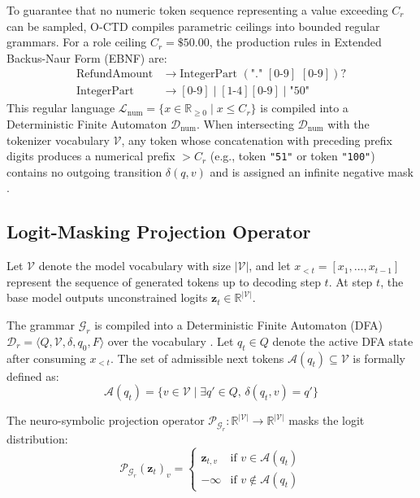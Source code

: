 \documentclass[preprint,12pt,3p]{elsarticle}
\begin{document}
To guarantee that no numeric token sequence representing a value exceeding $C_r$ can be sampled, O-CTD compiles parametric ceilings into bounded regular grammars. For a role ceiling $C_r = \$50.00$, the production rules in Extended Backus-Naur Form (EBNF) are:
\begin{align}
    \text{RefundAmount} &\to \text{IntegerPart} \,\, (\text{"."} \,\, [0\text{-}9] \,\, [0\text{-}9])? \\
    \text{IntegerPart} &\to [0\text{-}9] \mid [1\text{-}4][0\text{-}9] \mid \text{"50"}
\end{align}
This regular language $\mathcal{L}_{\text{num}} = \{ x \in \mathbb{R}_{\ge 0} \mid x \le C_r \}$ is compiled into a Deterministic Finite Automaton $\mathcal{D}_{\text{num}}$. When intersecting $\mathcal{D}_{\text{num}}$ with the tokenizer vocabulary $\mathcal{V}$, any token whose concatenation with preceding prefix digits produces a numerical prefix $> C_r$ (e.g., token \texttt{"51"} or token \texttt{"100"}) contains no outgoing transition $\delta(q, v)$ and is assigned an infinite negative mask \cite{beurer2024guiding}.

\subsection{Logit-Masking Projection Operator}

Let $\mathcal{V}$ denote the model vocabulary with size $|\mathcal{V}|$, and let $x_{<t} = [x_1, \dots, x_{t-1}]$ represent the sequence of generated tokens up to decoding step $t$. At step $t$, the base model outputs unconstrained logits $\mathbf{z}_t \in \mathbb{R}^{|\mathcal{V}|}$.

The grammar $\mathcal{G}_r$ is compiled into a Deterministic Finite Automaton (DFA) $\mathcal{D}_r = \langle Q, \mathcal{V}, \delta, q_0, F \rangle$ over the vocabulary \cite{roy2024automata, sordoni2024automata}. Let $q_t \in Q$ denote the active DFA state after consuming $x_{<t}$. The set of admissible next tokens $\mathcal{A}(q_t) \subseteq \mathcal{V}$ is formally defined as:
\begin{equation}
    \mathcal{A}(q_t) = \{ v \in \mathcal{V} \mid \exists q' \in Q, \, \delta(q_t, v) = q' \}
\end{equation}

The neuro-symbolic projection operator $\mathcal{P}_{\mathcal{G}_r}: \mathbb{R}^{|\mathcal{V}|} \to \mathbb{R}^{|\mathcal{V}|}$ masks the logit distribution:
\begin{equation}
    \mathcal{P}_{\mathcal{G}_r}(\mathbf{z}_t)_v = 
    \begin{cases} 
        \mathbf{z}_{t, v} & \text{if } v \in \mathcal{A}(q_t) \\
        -\infty & \text{if } v \notin \mathcal{A}(q_t)
    \end{cases}
\end{equation}
\end{document}
